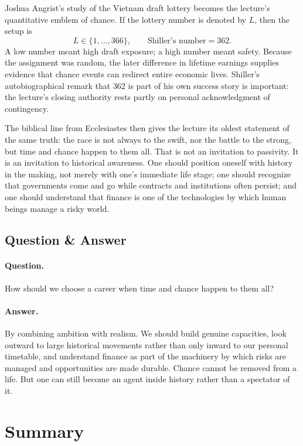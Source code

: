 Joshua Angrist's study of the Vietnam draft lottery becomes the lecture's quantitative emblem of chance. If the lottery number is denoted by \(L\), then the setup is
\begin{equation}
L \in \{1,\dots,366\},\qquad \text{Shiller's number}=362.
\end{equation}
A low number meant high draft exposure; a high number meant safety. Because the assignment was random, the later difference in lifetime earnings supplies evidence that chance events can redirect entire economic lives. Shiller's autobiographical remark that \(362\) is part of his own success story is important: the lecture's closing authority rests partly on personal acknowledgment of contingency.

The biblical line from Ecclesiastes then gives the lecture its oldest statement of the same truth: the race is not always to the swift, nor the battle to the strong, but time and chance happen to them all. That is not an invitation to passivity. It is an invitation to historical awareness. One should position oneself with history in the making, not merely with one's immediate life stage; one should recognize that governments come and go while contracts and institutions often persist; and one should understand that finance is one of the technologies by which human beings manage a risky world.

\subsection{Question \& Answer}

\paragraph{Question.} How should we choose a career when time and chance happen to them all?

\paragraph{Answer.} By combining ambition with realism. We should build genuine capacities, look outward to large historical movements rather than only inward to our personal timetable, and understand finance as part of the machinery by which risks are managed and opportunities are made durable. Chance cannot be removed from a life. But one can still become an agent inside history rather than a spectator of it.

\section{Summary}

